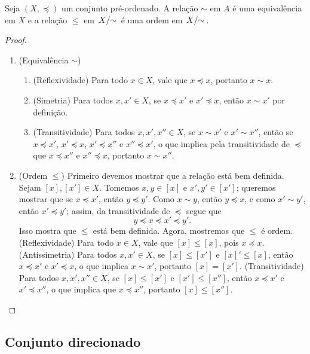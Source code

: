 \begin{proposition}
Seja $(X,\preceq)$ um conjunto pré-ordenado. A relação $\sim$ em $A$ é uma equivalência em $X$ e a relação $\leq$ em $\quo{X}{\sim}$ é uma ordem em $\quo{X}{\sim}$.
\end{proposition}
\begin{proof}
	\begin{enumerate}
		\item (Equivalência $\sim$)
			\begin{enumerate}
				\item (Reflexividade) Para todo $x \in X$, vale que $x \preceq x$, portanto $x \sim x$.
				
				\item (Simetria) Para todos $x,x' \in X$, se $x \preceq x'$ e $x' \preceq x$, então $x \sim x'$ por definição.
				
				\item (Transitividade) Para todos $x,x',x'' \in X$, se $x \sim x'$ e $x' \sim x''$, então se $x \preceq x'$, $x' \preceq x$, $x' \preceq x''$ e $x'' \preceq x'$, o que implica pela transitividade de $\preceq$ que $x \preceq x''$ e $x'' \preceq x$, portanto $x \sim x''$.
			\end{enumerate}
		
		\item (Ordem $\leq$) Primeiro devemos mostrar que a relação está bem definida. Sejam $[x],[x'] \in X$. Tomemos $x,y \in [x]$ e $x',y' \in [x']$; queremos mostrar que se $x \preceq x'$, então $y \preceq y'$. Como $x \sim y$, então $y \preceq x$, e como $x' \sim y'$, então $x' \preceq y'$; assim, da transitividade de $\preceq$ segue que
	\begin{equation*}
	y \preceq x \preceq x' \preceq y'.
	\end{equation*}
Isso mostra que $\leq$ está bem definida. Agora, mostremos que $\leq$ é ordem. (Reflexividade) Para todo $x \in X$, vale que $[x] \leq [x]$, pois $x \preceq x$. (Antissimetria) Para todos $x,x' \in X$, se $[x] \leq [x']$ e $[x]' \leq [x]$, então $x \preceq x'$ e $x' \preceq x$, o que implica $x \sim x'$, portanto $[x]=[x']$. (Transitividade) Para todos $x,x',x'' \in X$, se $[x] \leq [x']$ e $[x'] \leq [x'']$, então $x \preceq x'$ e $x' \preceq x''$, o que implica que $x \preceq x''$, portanto $[x] \leq [x'']$.
	\end{enumerate}
\end{proof}

\subsection{Conjunto direcionado}

